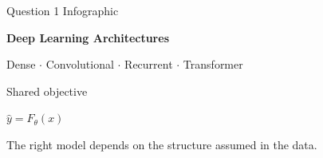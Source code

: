 \documentclass[landscape]{article}
\begin{document}
\begin{tcolorbox}[enhanced,arc=4mm,boxrule=0pt,colback=ink,left=6mm,right=6mm,top=4mm,bottom=4mm]
\begin{minipage}[c]{0.43\linewidth}
  {\color{white!68}\small Question 1 Infographic}\par\vspace{0.7mm}
  {\color{white}\fontsize{24}{28}\selectfont\bfseries Deep Learning Architectures}\par
  \vspace{1mm}
  {\color{white!78}\large Dense $\cdot$ Convolutional $\cdot$ Recurrent $\cdot$ Transformer}
\end{minipage}\hfill
\begin{minipage}[c]{0.25\linewidth}
  \centering
  {\color{white!82}\small Shared objective}\par\vspace{0.7mm}
  {\color{white}\Large $\hat{y}=F_{\theta}(x)$}\par
\end{minipage}\hfill
\begin{minipage}[c]{0.27\linewidth}
  \RaggedLeft
  {\color{white!72}\scriptsize The right model depends on the structure assumed in the data.}
\end{minipage}
\end{tcolorbox}

\vspace{3mm}
\end{document}
